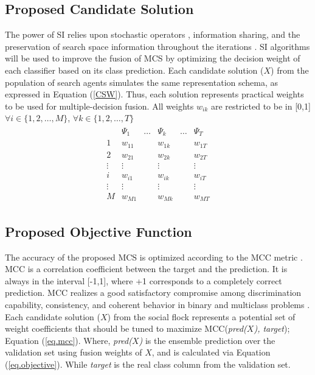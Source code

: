 \subsection{Proposed Candidate Solution}
The power of SI relies upon stochastic operators \cite{bianchi2009,hassanien2018}, information sharing, and the preservation of search space information throughout the iterations \cite{mirjalili2016}. SI algorithms will be used to improve the fusion of MCS by optimizing the decision weight of each classifier based on its class prediction. Each candidate solution ($X$) from the population of search agents simulates the same representation schema, as expressed in Equation (\ref{CSW}). Thus, each solution represents practical weights to be used for multiple-decision fusion. All weights $w_{ik}$ are restricted to be in [0,1] $\forall i \in \{1, 2, \dots, M\}$, $\forall k \in \{1, 2, \dots, T\}$
\begin{gather}
	\label{CSW}
	\begin{array}{c|ccccc}
		       & \Psi_1 & \dots & \Psi_k  & \dots & \Psi_T  \\ \hline
		1      & w_{11} &       & w_{1k}  &       & w_{1T}  \\
		2      & w_{21} &       & w_{2k}  &       & w_{2T}  \\
		\vdots & \vdots &       & \vdots  &       & \vdots  \\
		i      & w_{i1} &       & w_{ik}  &       & w_{iT}  \\
		\vdots & \vdots &       & \vdots  &       & \vdots  \\
		M      & w_{M1} &       & w_{M k} &       & w_{M T}
	\end{array}
\end{gather}


\subsection{Proposed Objective Function} \label{Mcc-objective}
The accuracy of the proposed MCS is optimized according to the MCC metric \cite{matthews1975}. MCC is a correlation coefficient between the target and the prediction. It is always in the interval [-1,1], where +1 corresponds to a completely correct prediction. MCC realizes a good satisfactory compromise among
discrimination capability, consistency, and coherent behavior in binary and multiclass problems \cite{jurman2012}. Each candidate solution ($X$) from the social flock represents a potential set of weight coefficients that should be tuned to maximize MCC(\textit{pred($X$), target}); Equation (\ref{eq.mcc}). Where, \textit{pred($X$)} is  the ensemble prediction over the validation set using fusion weights of $X$, and is calculated via Equation (\ref{eq.objective}). While \textit{ target} is the real class column from the validation set.

